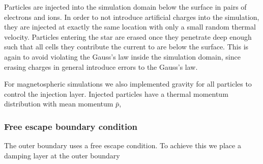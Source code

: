Particles are injected into the simulation domain below the surface in pairs of
electrons and ions. In order to not introduce artificial charges into the
simulation, they are injected at exactly the same location with only a small
random thermal velocity. Particles entering the star are erased once they
penetrate deep enough such that all cells they contribute the current to are
below the surface. This is again to avoid violating the Gauss's law inside the
simulation domain, since erasing charges in general introduce errors to the
Gauss's law.

For magnetospheric simulations we also implemented gravity for all particles to
control the injection layer. Injected particles have a thermal momentum
distribution with mean momentum $\bar{p}$,

\subsubsection{Free escape boundary condition}
\label{sec:escape-bc}

The outer boundary uses a free escape condition. To achieve this we place a
damping layer at the outer boundary




